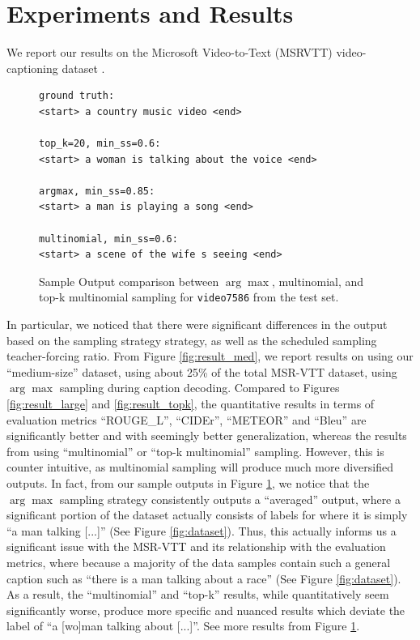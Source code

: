 \documentclass[11pt,a4paper]{article}
\begin{document}
\section{Experiments and Results}

We report our results on the Microsoft Video-to-Text (MSRVTT) video-captioning dataset \citet{Xu2016}. 


\begin{figure}
\begin{lstlisting}
ground truth:
<start> a country music video <end>

top_k=20, min_ss=0.6:
<start> a woman is talking about the voice <end>

argmax, min_ss=0.85:
<start> a man is playing a song <end>

multinomial, min_ss=0.6:
<start> a scene of the wife s seeing <end>
\end{lstlisting}
\caption{Sample Output comparison between $\arg\max$, multinomial, and top-k multinomial sampling for \texttt{video7586} from the test set.}
\label{fig:output}
\end{figure}

In particular, we noticed that there were significant differences in the output based on the sampling strategy strategy, as well as the scheduled sampling teacher-forcing ratio. From Figure \ref{fig:result_med}, we report results on using our ``medium-size'' dataset, using about 25\% of the total MSR-VTT dataset, using $\arg\max$ sampling during caption decoding. Compared to Figures \ref{fig:result_large} and \ref{fig:result_topk}, the quantitative results in terms of evaluation metrics ``ROUGE\_L'', ``CIDEr'', ``METEOR'' and ``Bleu'' are significantly better and with seemingly better generalization, whereas the results from using ``multinomial'' or ``top-k multinomial'' sampling. However, this is counter intuitive, as multinomial sampling will produce much more diversified outputs. In fact, from our sample outputs in Figure \ref{fig:output}, we notice that the $\arg\max$ sampling strategy consistently outputs a ``averaged'' output, where a significant portion of the dataset actually consists of labels for where it is simply ``a man talking [...]'' (See Figure \ref{fig:dataset}). Thus, this actually informs us a significant issue with the MSR-VTT and its relationship with the evaluation metrics, where because a majority of the data samples contain such a general caption such as ``there is a man talking about a race'' (See Figure \ref{fig:dataset}). As a result, the ``multinomial'' and ``top-k'' results, while quantitatively seem significantly worse, produce more specific and nuanced results which deviate the label of ``a [wo]man talking about [...]''. See more results from Figure \ref{fig:output}.
\end{document}
